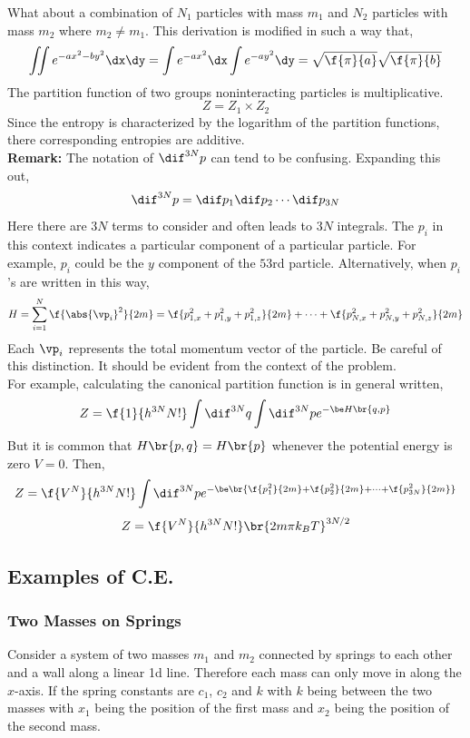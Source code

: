 \documentclass{article}
\begin{document}
What about a combination of $N_1$ particles with mass $m_1$ and $N_2$ particles with mass $m_2$ where $m_2 \neq m_1$. This derivation is modified in such a way that,
\[ \iint e^{-ax^2 - by^2}\dx\dy = \int e^{-ax^2}\dx\int e^{-ay^2}\dy = \sqrt{\f{\pi}{a}}\sqrt{\f{\pi}{b}}\]
The partition function of two groups noninteracting particles is multiplicative.
\[ Z = Z_1 \times Z_2 \]
Since the entropy is characterized by the logarithm of the partition functions, there corresponding entropies are additive.\\

\textbf{Remark:} The notation of $\dif^{3N} p$ can tend to be confusing. Expanding this out,
\[ \dif^{3N} p = \dif p_1 \dif p_2 \cdots \dif p_{3N}  \]
Here there are $3N$ terms to consider and often leads to $3N$ integrals. The $p_i$ in this context indicates a particular component of a particular particle. For example, $p_i$ could be the $y$ component of the $53$rd particle. Alternatively, when $p_i$'s are written in this way,
\[ H = \sum_{i=1}^N \f{\abs{\vp_i}^2}{2m} = \f{p_{1,x}^2 + p_{1,y}^2 + p_{1,z}^2}{2m} + \cdots + \f{p_{N,x}^2 + p_{N,y}^2 + p_{N,z}^2}{2m} \]
Each $\vp_i$ represents the total momentum vector of the particle. Be careful of this distinction. It should be evident from the context of the problem. \\

For example, calculating the canonical partition function is in general written,
\[ Z = \f{1}{h^{3N} N!} \int \dif^{3N}q\int \dif^{3N}p e^{-\be H\br{q,p}} \]
But it is common that $H\br{p,q} = H\br{p}$ whenever the potential energy is zero $V = 0$. Then,
\[ Z = \f{V^{N}}{h^{3N} N!} \int \dif^{3N}p e^{-\be \br{\f{p_1^2}{2m} + \f{p_2^2}{2m} + \cdots + \f{p_{3N}^2}{2m}}} \]
\[ Z = \f{V^{N}}{h^{3N} N!} \br{2m\pi k_B T}^{3N/2} \]

\subsection{Examples of C.E.}

\subsubsection{Two Masses on Springs}
Consider a system of two masses $m_1$ and $m_2$ connected by springs to each other and a wall along a linear 1d line. Therefore each mass can only move in along the $x$-axis. If the spring constants are $c_1$, $c_2$ and $k$ with $k$ being between the two masses with $x_1$ being the position of the first mass and $x_2$ being the position of the second mass.
\end{document}
